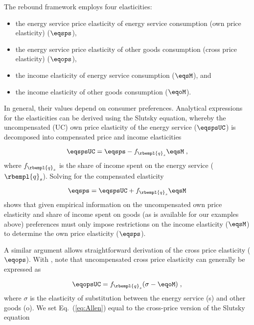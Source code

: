 

The rebound framework employs four elasticities:
%
\begin{itemize}

  \item the energy service price elasticity of energy service consumption (own price elasticity) ($\eqsps$),

  \item the energy service price elasticity of other goods consumption (cross price elasticity) ($\eqops$), 
  
  \item the income elasticity of energy service consumption ($\eqsM$), and 
  
  \item the income elasticity of other goods consumption ($\eqoM$).

\end{itemize}
%
In general, their values depend on consumer preferences.
Analytical expressions for the elasticities can be derived using the Slutsky equation, 
whereby the uncompensated (UC) own price elasticity 
of the energy service ($\eqspsUC$) 
is decomposed into compensated price and income elasticities

\begin{equation}
  \eqspsUC = \eqsps - f_{\rbempl{q}_s} \eqsM \; ,
\end{equation}
%
where $f_{\rbempl{q}_s}$ is the share of income spent 
on the energy service ($\rbempl{q}_s$). 
Solving for the compensated elasticity 

\begin{equation} \label{eq:eqsps}
  \eqsps = \eqspsUC + f_{\rbempl{q}_s} \eqsM
\end{equation}
%
shows that given empirical information 
on the uncompensated own price elasticity and
share of income spent on goods (as is available for our examples above) 
preferences must only impose restrictions 
on the income elasticity ($\eqsM$) to determine the own price elasticity ($\eqsps$).
 
A similar argument allows straightforward derivation 
of the cross price elasticity ($\eqops$).
With \citet{Hicks1934}, 
note that uncompensated cross price elasticity can generally be expressed as

\begin{equation} \label{eq:Allen}
  \eqopsUC = f_{\rbempl{q}_s} (\sigma - \eqoM) \; ,
\end{equation}
%
where $\sigma$ is the elasticity of substitution between the energy service (s) and other goods (o). 
We set Eq.~(\ref{eq:Allen}) equal to 
the cross-price version of the Slutsky equation

